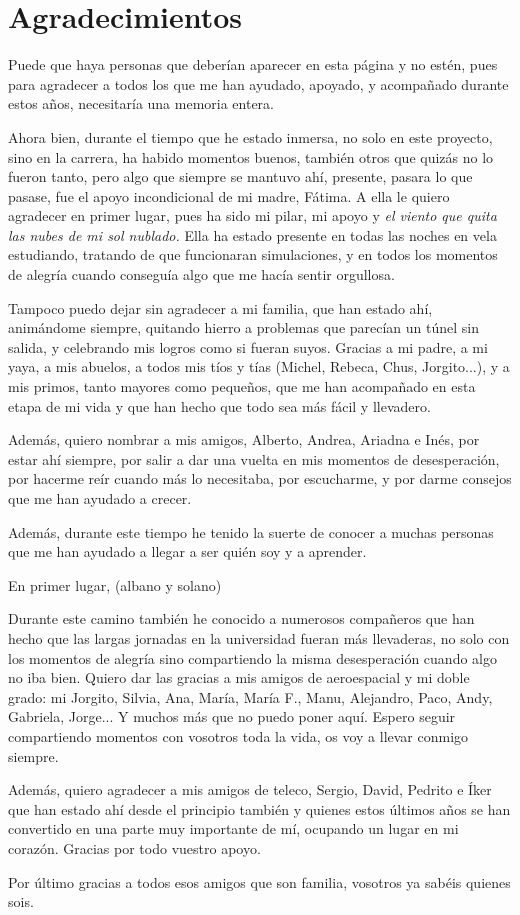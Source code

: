 \chapter*{Agradecimientos}

Puede que haya personas que deberían aparecer en esta página y no estén, pues para agradecer a todos los que me han ayudado, apoyado, y acompañado durante estos años, necesitaría una memoria entera.

Ahora bien, durante el tiempo que he estado inmersa, no solo en este proyecto, sino en la carrera, ha habido momentos buenos, también otros que quizás no lo fueron tanto, pero algo que siempre se mantuvo ahí, presente, pasara lo que pasase, fue el apoyo incondicional de mi madre, Fátima. A ella le quiero agradecer en primer lugar, pues ha sido mi pilar, mi apoyo y \textit{el viento que quita las nubes de mi sol nublado.} Ella ha estado presente en todas las noches en vela estudiando, tratando de que funcionaran simulaciones, y en todos los momentos de alegría cuando conseguía algo que me hacía sentir orgullosa.

Tampoco puedo dejar sin agradecer a mi familia, que han estado ahí, animándome siempre, quitando hierro a problemas que parecían un túnel sin salida, y celebrando mis logros como si fueran suyos. Gracias a mi padre, a mi yaya, a mis abuelos, a todos mis tíos y tías (Michel, Rebeca, Chus, Jorgito...), y a mis primos, tanto mayores como pequeños, que me han acompañado en esta etapa de mi vida y que han hecho que todo sea más fácil y llevadero.

Además, quiero nombrar a mis amigos, Alberto, Andrea, Ariadna e Inés, por estar ahí siempre, por salir a dar una vuelta en mis momentos de desesperación, por hacerme reír cuando más lo necesitaba, por escucharme, y por darme consejos que me han ayudado a crecer.

Además, durante este tiempo he tenido la suerte de conocer a muchas personas que me han ayudado a llegar a ser quién soy y a aprender.

En primer lugar, (albano y solano)

Durante este camino también he conocido a numerosos compañeros que han hecho que las largas jornadas en la universidad fueran más llevaderas, no solo con los momentos de alegría sino compartiendo la misma desesperación cuando algo no iba bien. Quiero dar las gracias a mis amigos de aeroespacial y mi doble grado: mi Jorgito, Silvia, Ana, María, María F., Manu, Alejandro, Paco, Andy, Gabriela, Jorge... Y muchos más que no puedo poner aquí. Espero seguir compartiendo momentos con vosotros toda la vida, os voy a llevar conmigo siempre.

Además, quiero agradecer a mis amigos de teleco, Sergio, David, Pedrito e Íker que han estado ahí desde el principio también y quienes estos últimos años se han convertido en una parte muy importante de mí, ocupando un lugar en mi corazón. Gracias por todo vuestro apoyo.

Por último gracias a todos esos amigos que son familia, vosotros ya sabéis quienes sois.
